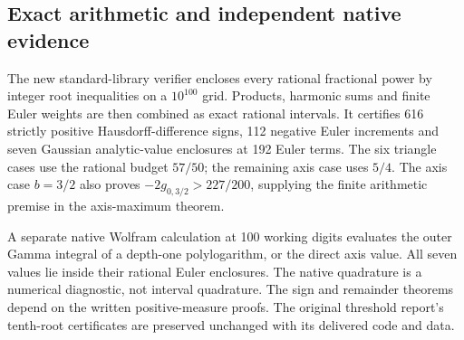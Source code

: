 \subsection{Exact arithmetic and independent native evidence}
\label{rw:sec:certificates}
The new standard-library verifier encloses every rational fractional power
by integer root inequalities on a $10^{100}$ grid. Products, harmonic sums
and finite Euler weights are then combined as exact rational intervals.
It certifies 616 strictly positive Hausdorff-difference signs, 112 negative
Euler increments and seven Gaussian analytic-value enclosures at 192
Euler terms. The six triangle cases use the rational budget $57/50$;
the remaining axis case uses $5/4$. The axis case $b=3/2$ also proves
$-2g_{0,3/2}>227/200$, supplying the finite arithmetic premise in the
axis-maximum theorem.

A separate native Wolfram calculation at 100 working digits evaluates
the outer Gamma integral of a depth-one polylogarithm, or the direct
axis value. All seven values lie inside their rational Euler enclosures.
The native quadrature is a numerical diagnostic, not interval quadrature.
The sign and remainder theorems depend on the written positive-measure
proofs. The original threshold report's tenth-root certificates are
preserved unchanged with its delivered code and data.

